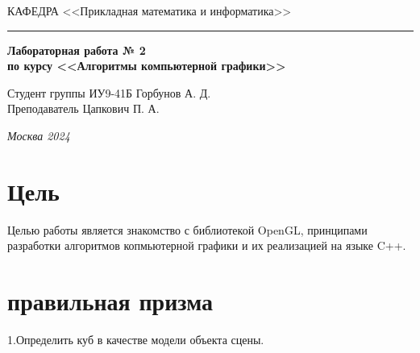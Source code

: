 \documentclass[a4paper, 14pt]{extarticle}
\begin{document}
\begin{titlepage}
\vspace{0.5ex}
\hspace{-35pt} \noindent \small КАФЕДРА\hspace{50pt} <<Прикладная математика и информатика>>

\vspace*{-16pt}
\hspace{30pt}\rule{0.866\textwidth}{0.4pt}
  
\vspace{11em}

\begin{center}
\Large {\bf Лабораторная работа № 2} \\ 
\large {\bf по курсу <<Алгоритмы компьютерной графики>>}\\
\end{center}\normalsize

\vspace{8em}


\begin{flushright}
  {Студент группы ИУ9-41Б Горбунов А. Д.\hspace*{15pt} \\
  \vspace{2ex}
  Преподаватель Цапкович П. А.\hspace*{15pt}}
\end{flushright}

\bigskip

\vfill
 

\begin{center}
\textsl{Москва 2024}
\end{center}
\end{titlepage}

\renewcommand{\ttdefault}{pcr}

\setlength{\tabcolsep}{3pt}
\newpage
\setcounter{page}{2}

\section{Цель}\label{Sect::task}
\par
Целью работы является знакомство с  библиотекой OpenGL, принципами разработки алгоритмов копмьютерной графики и их реализацией на языке C++.
\section{правильная призма}\label{Sect::task}
\par
1.Определить куб в качестве модели объекта сцены.
\end{document}
